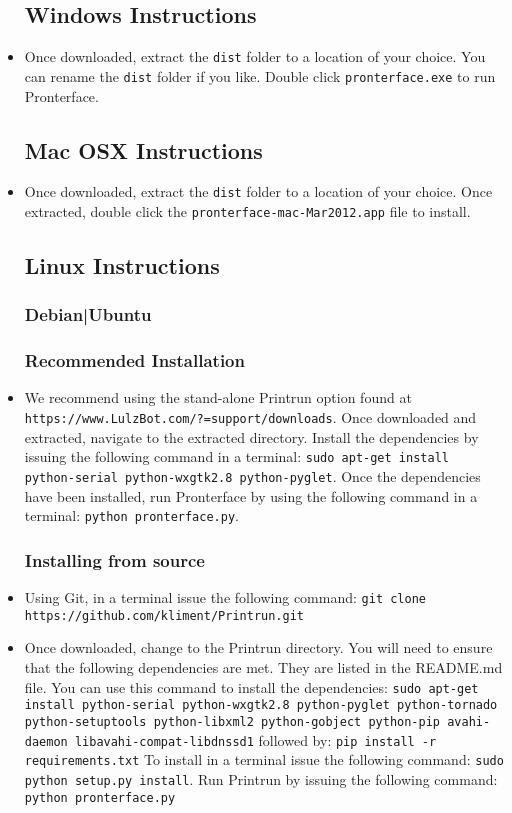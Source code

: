 \begin{itemize}
\subsection{Windows Instructions}
\item Once downloaded, extract the \texttt{dist} folder to a location of your choice. You can rename the \texttt{dist} folder if you like. Double click \texttt{pronterface.exe} to run Pronterface.


\subsection{Mac OSX Instructions}
\item Once downloaded, extract the \texttt{dist} folder to a location of your choice. Once extracted, double click the \texttt{pronterface-mac-Mar2012.app} file to install.

\subsection{Linux Instructions}
\subsubsection{Debian|Ubuntu}
\subsubsection{Recommended Installation}
\item We recommend using the stand-alone Printrun option found at \texttt{https://www.LulzBot.com/?=support/downloads}. Once downloaded and extracted, navigate to the extracted directory. Install the dependencies by issuing the following command in a terminal: \texttt{sudo apt-get install python-serial python-wxgtk2.8 python-pyglet}. Once the dependencies have been installed, run Pronterface by using the following command in a terminal: \texttt{python pronterface.py}.

\subsubsection{Installing from source}
\item Using Git, in a terminal issue the following command: \texttt{git clone https://github.com/kliment/Printrun.git}
\item Once downloaded, change to the Printrun directory. You will need to ensure that the following dependencies are met. They are listed in the README.md file. You can use this command to install the dependencies: 
\texttt{sudo apt-get install python-serial python-wxgtk2.8 python-pyglet python-tornado python-setuptools python-libxml2 python-gobject python-pip avahi-daemon libavahi-compat-libdnssd1}
followed by:
\texttt{pip install -r requirements.txt}
To install in a terminal issue the following command:
\texttt{sudo python setup.py install}.
Run Printrun by issuing the following command:
\texttt{python pronterface.py}


\end{itemize}
